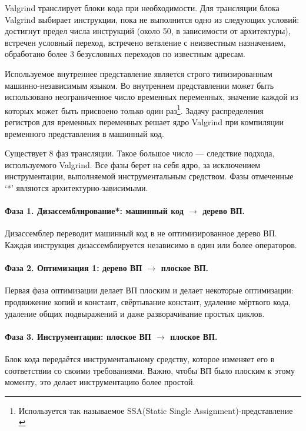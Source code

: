 \documentclass[a4paper,12pt,russian]{article}
\newcommand{\code}[1]{\textsf{#1}}
\begin{document}
\code{Valgrind} транслирует блоки кода при необходимости. Для трансляции блока \code{Valgrind} выбирает инструкции, пока не выполнится одно из следующих условий: достигнут предел числа инструкций (около 50, в зависимости от архитектуры), встречен условный переход, встречено ветвление с неизвестным назначением, обработано более 3 безусловных переходов по известным адресам.

Используемое внутреннее представление является строго типизированным машинно-независимым языком. Во внутреннем представлении может быть использовано неограниченное число временных переменных, значение каждой из которых может быть присвоено только один раз\footnote{Используется так называемое SSA(Static Single Assignment)-представление \cite{aho_compilers}}. Задачу распределения регистров для временных переменных решает ядро \code{Valgrind} при компиляции временного представления в машинный код.

Существует 8 фаз трансляции. Такое большое число --- следствие подхода, используемого \code{Valgrind}. Все фазы берет на себя ядро, за исключением инструментации, выполняемой инструментальным средством. Фазы отмеченные `*' являются архитектурно-зависимыми.

\paragraph{Фаза 1. Дизассемблирование*: машинный код $\longrightarrow$ дерево ВП.}
Дизассемблер переводит машинный код в не оптимизированное дерево ВП. Каждая инструкция дизассемблируется независимо в один или более операторов.

\paragraph{Фаза 2. Оптимизация 1: дерево ВП $\longrightarrow$ плоское ВП.}
Первая фаза оптимизации делает ВП плоским и делает некоторые оптимизации: продвижение копий и констант, свёртывание констант, удаление мёртвого кода, удаление общих подвыражений и даже разворачивание простых циклов.

\paragraph{Фаза 3. Инструментация: плоское ВП $\longrightarrow$ плоское ВП.}
Блок кода передаётся инструментальному средству, которое изменяет его в соответствии со своими требованиями. Важно, чтобы ВП было плоским к этому моменту, это делает инструментацию более простой.
\end{document}
